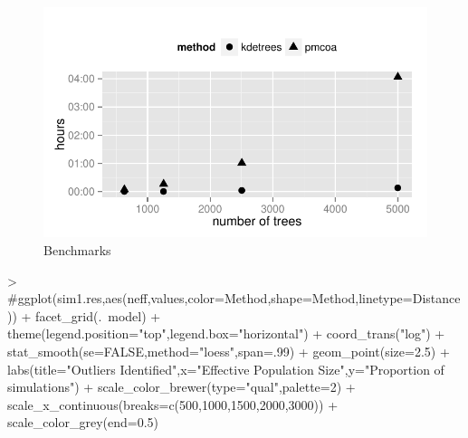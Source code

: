\documentclass{article}
\begin{document}
\begin{figure}
  \centering
  \includegraphics{img/bench}
  \caption{Benchmarks}
  \label{fig:bench}
\end{figure}

\begin{Schunk}
\begin{Sinput}
> #ggplot(sim1.res,aes(neff,values,color=Method,shape=Method,linetype=Distance)) + facet_grid(.~model) + theme(legend.position="top",legend.box="horizontal") + coord_trans("log") + stat_smooth(se=FALSE,method="loess",span=.99) + geom_point(size=2.5) + labs(title="Outliers Identified",x="Effective Population Size",y="Proportion of simulations") + scale_color_brewer(type="qual",palette=2) + scale_x_continuous(breaks=c(500,1000,1500,2000,3000)) + scale_color_grey(end=0.5)
\end{Sinput}
\end{Schunk}
\end{document}
